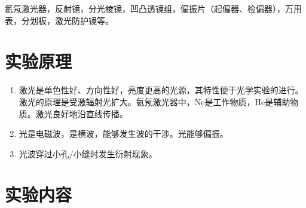 \documentclass[11pt]{article}
\begin{document}
    \hspace*{2em} 
    氦氖激光器，反射镜，分光棱镜，凹凸透镜组，偏振片（起偏器、检偏器），万用表，分划板，激光防护镜等。

\section{实验原理}
\begin{enumerate}
    \item 激光是单色性好、方向性好，亮度更高的光源，其特性便于光学实验的进行。激光的原理是受激辐射光扩大。氦氖激光器中，Ne是工作物质，He是辅助物质。激光良好地沿直线传播。
    \item 光是电磁波，是横波，能够发生波的干涉。光能够偏振。
    \item 光波穿过小孔/小缝时发生衍射现象。
\end{enumerate}


\section{实验内容}
\end{document}
